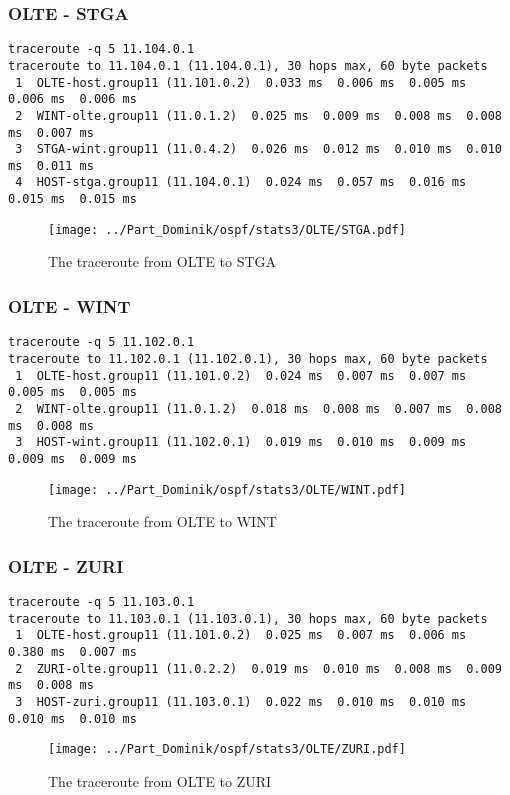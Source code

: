 \subsubsection{OLTE - STGA}
\begin{lstlisting}
traceroute -q 5 11.104.0.1
traceroute to 11.104.0.1 (11.104.0.1), 30 hops max, 60 byte packets
 1  OLTE-host.group11 (11.101.0.2)  0.033 ms  0.006 ms  0.005 ms  0.006 ms  0.006 ms
 2  WINT-olte.group11 (11.0.1.2)  0.025 ms  0.009 ms  0.008 ms  0.008 ms  0.007 ms
 3  STGA-wint.group11 (11.0.4.2)  0.026 ms  0.012 ms  0.010 ms  0.010 ms  0.011 ms
 4  HOST-stga.group11 (11.104.0.1)  0.024 ms  0.057 ms  0.016 ms  0.015 ms  0.015 ms
\end{lstlisting}
\begin{figure}[H]
\centering
\texttt{[image: ../Part\_Dominik/ospf/stats3/OLTE/STGA.pdf]}
\caption{The traceroute from OLTE to STGA}
\end{figure}
\clearpage
\subsubsection{OLTE - WINT}
\begin{lstlisting}
traceroute -q 5 11.102.0.1
traceroute to 11.102.0.1 (11.102.0.1), 30 hops max, 60 byte packets
 1  OLTE-host.group11 (11.101.0.2)  0.024 ms  0.007 ms  0.007 ms  0.005 ms  0.005 ms
 2  WINT-olte.group11 (11.0.1.2)  0.018 ms  0.008 ms  0.007 ms  0.008 ms  0.008 ms
 3  HOST-wint.group11 (11.102.0.1)  0.019 ms  0.010 ms  0.009 ms  0.009 ms  0.009 ms
\end{lstlisting}
\begin{figure}[H]
\centering
\texttt{[image: ../Part\_Dominik/ospf/stats3/OLTE/WINT.pdf]}
\caption{The traceroute from OLTE to WINT}
\end{figure}
\clearpage
\subsubsection{OLTE - ZURI}
\begin{lstlisting}
traceroute -q 5 11.103.0.1
traceroute to 11.103.0.1 (11.103.0.1), 30 hops max, 60 byte packets
 1  OLTE-host.group11 (11.101.0.2)  0.025 ms  0.007 ms  0.006 ms  0.380 ms  0.007 ms
 2  ZURI-olte.group11 (11.0.2.2)  0.019 ms  0.010 ms  0.008 ms  0.009 ms  0.008 ms
 3  HOST-zuri.group11 (11.103.0.1)  0.022 ms  0.010 ms  0.010 ms  0.010 ms  0.010 ms
\end{lstlisting}
\begin{figure}[H]
\centering
\texttt{[image: ../Part\_Dominik/ospf/stats3/OLTE/ZURI.pdf]}
\caption{The traceroute from OLTE to ZURI}
\end{figure}
\clearpage
